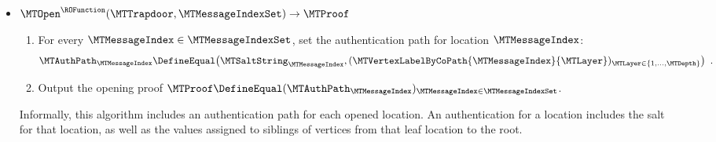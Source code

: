 \begin{itemize}[leftmargin=*]
\begin{enumerate}[nolistsep]
\begin{equation*}
\MTVertexLabels
=
\begin{bmatrix}
    \MTVertexLabelByName{0}{1} & & & & & \\
    \MTVertexLabelByName{1}{1} & \MTVertexLabelByName{1}{2} & & & & \\
    \MTVertexLabelByName{2}{1} & \MTVertexLabelByName{2}{2} & \MTVertexLabelByName{2}{3} & \MTVertexLabelByName{2}{4} & & \\
    \vdots & \vdots & \vdots & \vdots & \ddots & \\
    \MTVertexLabelByName{\MTDepth}{1} & \dots & \dots & \dots & \dots & \MTVertexLabelByName{\MTDepth}{2^{\MTDepth}}
\end{bmatrix}
\enspace.
\end{equation*}
    \item Set the opening trapdoor $\MTTrapdoor \DefineEqual (\MTSaltStrings,\MTVertexLabels)$.
    \item Output $(\MTCommitment,\MTTrapdoor)$.
  \end{enumerate}

  Informally, this algorithm first commits to each message entry via a basic commitment scheme (the one discussed in ) and labels the leaves of the binary tree with these commitments, and then recursively labels every vertex in the tree with the hash of the labels of its two children.

  \item $\MTOpen^{\ROFunction}(\MTTrapdoor, \MTMessageIndexSet) \to \MTProof$
  \begin{enumerate}[nolistsep]
    \item For every $\MTMessageIndex \in \MTMessageIndexSet$, set the authentication path for location $\MTMessageIndex$:
\begin{equation}
\label{equation:mt-authpath-structure}
\MTAuthPath_{\MTMessageIndex}
\DefineEqual
\big(
  \MTSaltString_{\MTMessageIndex}
  ,
  (\MTVertexLabelByCoPath{\MTMessageIndex}{\MTLayer})_{\MTLayer \in \{1,\dots,\MTDepth\}}
\big)
\enspace.
\end{equation}
    \item Output the opening proof $\MTProof \DefineEqual (\MTAuthPath_{\MTMessageIndex})_{\MTMessageIndex \in \MTMessageIndexSet}$.
  \end{enumerate}

  Informally, this algorithm includes an authentication path for each opened location. An authentication for a location includes the salt for that location, as well as the values assigned to siblings of vertices from that leaf location to the root.


\end{itemize}
